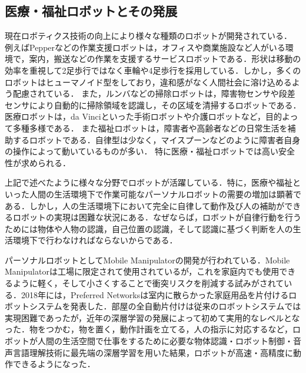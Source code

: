 \subsection{医療・福祉ロボットとその発展}
現在ロボティクス技術の向上により様々な種類のロボットが開発されている．
例えばPepper\cite{pepper}などの作業支援ロボットは，オフィスや商業施設など人がいる環境で，案内，搬送などの作業を支援するサービスロボットである．形状は移動の効率を重視して2足歩行ではなく車輪や4足歩行を採用している．しかし，多くのロボットはヒューマノイド型をしており，違和感がなく人間社会に溶け込めるよう配慮されている．
また，ルンバ\cite{ルンバ}などの掃除ロボットは，障害物センサや段差センサにより自動的に掃除領域を認識し，その区域を清掃するロボットである．
医療ロボットは，da Vinci\cite{ダビンチ}といった手術ロボットや介護ロボットなど，目的よって多種多様である．
また福祉ロボットは，障害者や高齢者などの日常生活を補助するロボットである．自律型は少なく，マイスプーン\cite{マイスプーン}などのように障害者自身の操作によって動いているものが多い．%
特に医療・福祉ロボットでは高い安全性が求められる．


上記で述べたように様々な分野でロボットが活躍している．特に，医療や福祉といった人間の生活環境下で作業可能なパーソナルロボットの需要の増加は顕著である．しかし，人の生活環境下において完全に自律して動作及び人の補助ができるロボットの実現は困難な状況にある．なぜならば，ロボットが自律行動を行うためには物体や人物の認識，自己位置の認識，そして認識に基づく判断を人の生活環境下で行わなければならないからである．

パーソナルロボットとしてMobile Manipulatorの開発が行われている．Mobile Manipulatorは工場に限定されて使用されているが，これを家庭内でも使用できるように軽く，そして小さくすることで衝突リスクを削減する試みがされている．2018年には，Preferred Networksは室内に散らかった家庭用品を片付けるロボットシステムを発表した\cite{お片づけロボット}．部屋の全自動片付けは従来のロボットシステムでは実現困難であったが，近年の深層学習の発展によって初めて実用的なレベルとなった．物をつかむ，物を置く，動作計画を立てる，人の指示に対応するなど，ロボットが人間の生活空間で仕事をするために必要な物体認識・ロボット制御・音声言語理解技術に最先端の深層学習を用いた結果，ロボットが高速・高精度に動作できるようになった．

